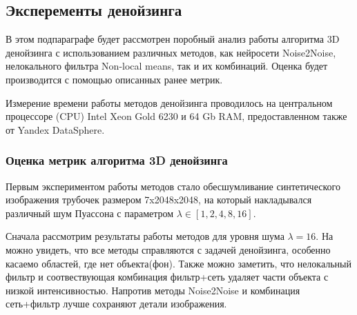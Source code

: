 \subsection{Эксперементы денойзинга}
\par В этом подпараграфе будет рассмотрен поробный анализ работы алгоритма 3D денойзинга с использованием различных методов, как нейросети Noise2Noise, нелокального фильтра Non-local means, так и их комбинаций. Оценка будет производится с помощью описанных ранее метрик. 
\par Измерение времени работы методов денойзинга проводилось на центральном процессоре (CPU) Intel Xeon Gold 6230 и 64 Gb RAM, предоставленном также от Yandex DataSphere. 
\subsubsection{Оценка метрик алгоритма 3D денойзинга}
\par Первым экспериментом работы методов стало обесшумливание синтетического изображения трубочек размером 7x2048x2048, на который накладывался различный шум Пуассона с параметром $\lambda \in [1, 2, 4, 8, 16]$.
\par Сначала рассмотрим результаты работы методов для уровня шума $\lambda=16$. На  можно увидеть, что все методы справляются с задачей денойзинга, особенно касаемо областей, где нет объекта(фон). Также можно заметить, что нелокальный фильтр и соотвествующая комбинация фильтр+сеть удаляет части объекта с низкой интенсивностью. Напротив методы Noise2Noise и комбинация сеть+фильтр лучше сохраняют детали изображения.  
